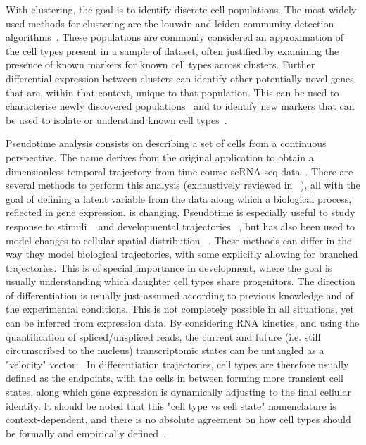 With clustering, the goal is to identify discrete cell populations. The most widely used methods for clustering are the louvain and leiden community detection algorithms~\citep{blondel_fast_2008,traag_louvain_2019}. These populations are commonly considered an approximation of the cell types present in a sample of dataset, often justified by examining the presence of known markers for known cell types across clusters. Further differential expression between clusters can identify other potentially novel genes that are, within that context, unique to that population. This can be used to characterise newly discovered populations~\citep{villani_single-cell_2017,montoro_revised_2018,shekhar_comprehensive_2016} and to identify new markers that can be used to isolate or understand known cell types~\citep{shulse_high-throughput_2019,vento-tormo_single-cell_2018,bjorklund_heterogeneity_2016}.

Pseudotime analysis consists on describing a set of cells from a continuous perspective. The name derives from the original application to obtain a dimensionless temporal trajectory from time course scRNA-seq data~\citep{trapnell_dynamics_2014}. There are several methods to perform this analysis (exhaustively reviewed in ~\citep{saelens_comparison_2019}), all with the goal of defining a latent variable from the data along which a biological process, reflected in gene expression, is changing. Pseudotime is especially useful to study response to stimuli ~\citep{trapnell_dynamics_2014,lonnberg_single-cell_2017} and developmental trajectories ~\citep{cao_single-cell_2019,watcham_new_2019}, but has also been used to model changes to cellular spatial distribution ~\citep{scialdone_resolving_2016}. These methods can differ in the way they model biological trajectories, with some explicitly allowing for branched trajectories. This is of special importance in development, where the goal is usually understanding which daughter cell types share  progenitors. The direction of differentiation is usually just assumed according to previous knowledge and of the experimental conditions. This is not completely possible in all situations, yet can be inferred from expression data. By considering RNA kinetics, and using the quantification of spliced/unspliced reads, the current and future (i.e. still circumscribed to the nucleus) transcriptomic states can be untangled as a "velocity" vector~\citep{manno_rna_2018}. In differentiation trajectories, cell types are therefore usually defined as the endpoints, with the cells in between forming more transient cell states, along which gene expression is dynamically adjusting to the final cellular identity. It should be noted that this "cell type vs cell state" nomenclature is context-dependent, and there is no absolute agreement on how cell types should be formally and empirically defined~\citep{noauthor_what_2017}. 

